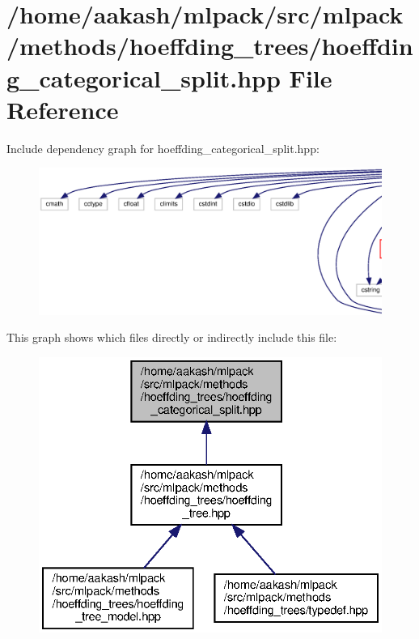 \section{/home/aakash/mlpack/src/mlpack/methods/hoeffding\+\_\+trees/hoeffding\+\_\+categorical\+\_\+split.hpp File Reference}
\label{hoeffding__categorical__split_8hpp}
Include dependency graph for hoeffding\+\_\+categorical\+\_\+split.\+hpp\+:
\nopagebreak
\begin{figure}[H]
\begin{center}
\leavevmode
\includegraphics[width=350pt]{hoeffding__categorical__split_8hpp__incl}
\end{center}
\end{figure}
This graph shows which files directly or indirectly include this file\+:
\nopagebreak
\begin{figure}[H]
\begin{center}
\leavevmode
\includegraphics[width=332pt]{hoeffding__categorical__split_8hpp__dep__incl}
\end{center}
\end{figure}
